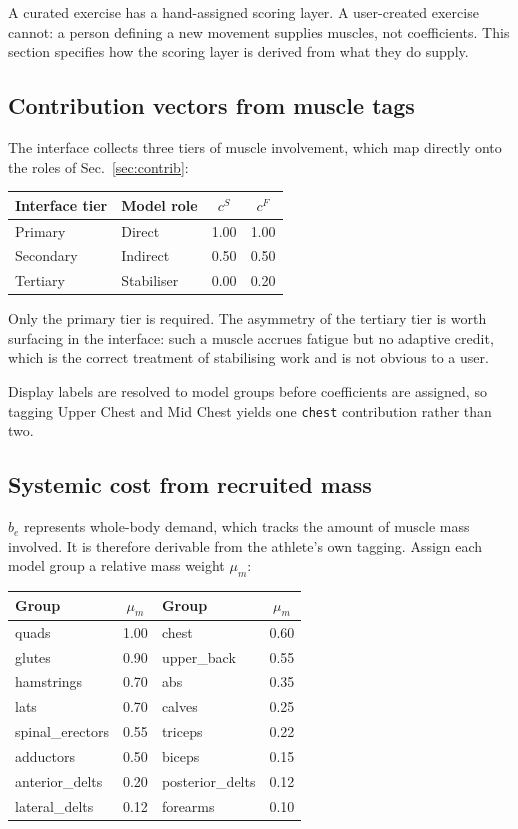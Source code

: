 \documentclass[11pt]{article}
\begin{document}
A curated exercise has a hand-assigned scoring layer. A user-created exercise cannot: a person defining a new movement supplies muscles, not coefficients. This section specifies how the scoring layer is derived from what they do supply.

\subsection{Contribution vectors from muscle tags}

The interface collects three tiers of muscle involvement, which map directly onto the roles of Sec.~\ref{sec:contrib}:

\begin{center}
\begin{tabular}{llcc}
\toprule
Interface tier & Model role & $c^S$ & $c^F$ \\
\midrule
Primary & Direct & 1.00 & 1.00 \\
Secondary & Indirect & 0.50 & 0.50 \\
Tertiary & Stabiliser & 0.00 & 0.20 \\
\bottomrule
\end{tabular}
\end{center}

Only the primary tier is required. The asymmetry of the tertiary tier is worth surfacing in the interface: such a muscle accrues fatigue but no adaptive credit, which is the correct treatment of stabilising work and is not obvious to a user.

Display labels are resolved to model groups before coefficients are assigned, so tagging Upper Chest and Mid Chest yields one \texttt{chest} contribution rather than two.

\subsection{Systemic cost from recruited mass}

$b_e$ represents whole-body demand, which tracks the amount of muscle mass involved. It is therefore derivable from the athlete's own tagging. Assign each model group a relative mass weight $\mu_m$:

\begin{center}
\begin{tabular}{lclc}
\toprule
Group & $\mu_m$ & Group & $\mu_m$ \\
\midrule
quads & 1.00 & chest & 0.60 \\
glutes & 0.90 & upper\_back & 0.55 \\
hamstrings & 0.70 & abs & 0.35 \\
lats & 0.70 & calves & 0.25 \\
spinal\_erectors & 0.55 & triceps & 0.22 \\
adductors & 0.50 & biceps & 0.15 \\
anterior\_delts & 0.20 & posterior\_delts & 0.12 \\
lateral\_delts & 0.12 & forearms & 0.10 \\
\bottomrule
\end{tabular}
\end{center}
\end{document}
